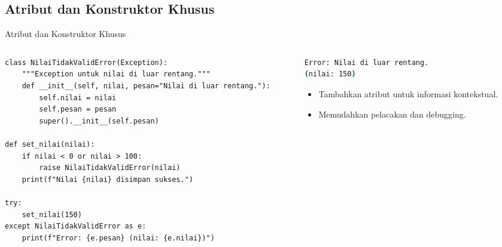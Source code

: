 \documentclass[aspectratio=169, table]{beamer}
\begin{document}
\subsection*{Atribut dan Konstruktor Khusus}
\begin{frame}[fragile]{Atribut dan Konstruktor Khusus}
\vspace*{10pt}
\begin{columns}
\begin{column}[t]{0.60\textwidth}
\begin{lstlisting}[style=PythonStyle, basicstyle=\ttfamily\scriptsize]
class NilaiTidakValidError(Exception):
    """Exception untuk nilai di luar rentang."""
    def __init__(self, nilai, pesan="Nilai di luar rentang."):
        self.nilai = nilai
        self.pesan = pesan
        super().__init__(self.pesan)

def set_nilai(nilai):
    if nilai < 0 or nilai > 100:
        raise NilaiTidakValidError(nilai)
    print(f"Nilai {nilai} disimpan sukses.")

try:
    set_nilai(150)
except NilaiTidakValidError as e:
    print(f"Error: {e.pesan} (nilai: {e.nilai})")
\end{lstlisting}
\end{column}

\begin{column}[t]{0.35\textwidth}
\begin{lstlisting}[language=bash]
Error: Nilai di luar rentang.
(nilai: 150)
\end{lstlisting}

\begin{itemize}
  \item Tambahkan atribut untuk informasi kontekstual.
  \item Memudahkan pelacakan dan debugging.
\end{itemize}
\end{column}
\end{columns}
\end{frame}
\end{document}
